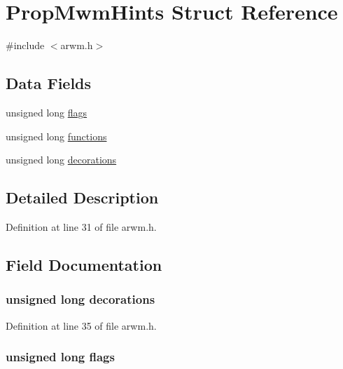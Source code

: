 \hypertarget{struct_prop_mwm_hints}{
\section{PropMwmHints Struct Reference}
\label{struct_prop_mwm_hints}
}


{\ttfamily \#include $<$arwm.h$>$}

\subsection*{Data Fields}
\begin{DoxyCompactItemize}
\item 
unsigned long \hyperlink{struct_prop_mwm_hints_a9e339c2784bd040b26a5112866700bff}{flags}
\item 
unsigned long \hyperlink{struct_prop_mwm_hints_a76dd892f687b605e187bc7b1b8c73fe0}{functions}
\item 
unsigned long \hyperlink{struct_prop_mwm_hints_aa5d026dc491d2704196f3ec24dd954d3}{decorations}
\end{DoxyCompactItemize}


\subsection{Detailed Description}


Definition at line 31 of file arwm.h.



\subsection{Field Documentation}
\hypertarget{struct_prop_mwm_hints_aa5d026dc491d2704196f3ec24dd954d3}{
\subsubsection[{decorations}]{\setlength{\rightskip}{0pt plus 5cm}unsigned long {\bf decorations}}}
\label{struct_prop_mwm_hints_aa5d026dc491d2704196f3ec24dd954d3}


Definition at line 35 of file arwm.h.

\hypertarget{struct_prop_mwm_hints_a9e339c2784bd040b26a5112866700bff}{
\subsubsection[{flags}]{\setlength{\rightskip}{0pt plus 5cm}unsigned long {\bf flags}}}
\label{struct_prop_mwm_hints_a9e339c2784bd040b26a5112866700bff}


